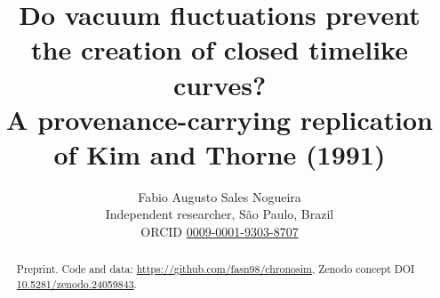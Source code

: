\documentclass[11pt,a4paper]{article}
\title{Do vacuum fluctuations prevent the creation of closed timelike curves?\\
A provenance-carrying replication of Kim and Thorne (1991)}
\author{Fabio Augusto Sales Nogueira\\
\small Independent researcher, S\~ao Paulo, Brazil\\
\small ORCID \href{https://orcid.org/0009-0001-9303-8707}{0009-0001-9303-8707}}
\date{}
\begin{document}
\maketitle

\begin{abstract}
\PreprintAbstract

\medskip\noindent Preprint. Code and data: \url{https://github.com/fasn98/chronosim}, Zenodo concept DOI \href{https://doi.org/10.5281/zenodo.24059843}{10.5281/zenodo.24059843}.
\end{abstract}





\end{document}
